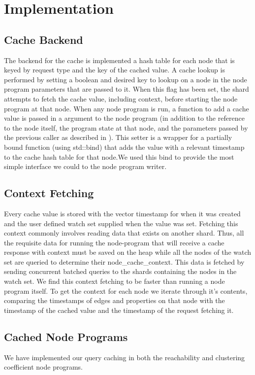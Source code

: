 \documentclass[letterpaper,twocolumn,11pt,tight]{article}
\begin{document}
\section{Implementation}\label{sec:design}
\subsection{Cache Backend}
The backend for the cache is implemented a hash table for each node that is keyed by request type and the key of the cached value. A cache lookup is performed by setting a boolean and desired key to lookup on a node in the node program parameters that are passed to it.
When this flag has been set, the shard attempts to fetch the cache value, including context, before starting the node program at that node. When any node program is run, a function to add a cache value is passed in a argument to the node program (in addition to the reference to the node itself, the program state at that node, and the parameters passed by the previous caller as described in ). This setter is a wrapper for a partially bound function (using std::bind) that adds the value with a relevant timestamp to the cache hash table for that node.We used this bind to provide the most simple interface we could to the node program writer. 
\subsection{Context Fetching}
Every cache value is stored with the vector timestamp for when it was created and the user defined watch set supplied when the value was set. Fetching this context commonly involves reading data that exists on another shard. Thus, all the requisite data for running the node-program that will receive a cache response with context must be saved on the heap while all the nodes of the watch set are queried to determine their node\_cache\_context.
This data is fetched by sending concurrent batched queries to the shards containing the nodes in the watch set. We find this context fetching to be faster than running a node program itself. To get the context for each node we iterate through it's contents, comparing the timestamps of edges and properties on that node with the timestamp of the cached value and the timestamp of the request fetching it. %
\subsection{Cached Node Programs}\label{sec:cached_progs}
We have implemented our query caching in both the reachability and clustering coefficient node programs.
\end{document}
